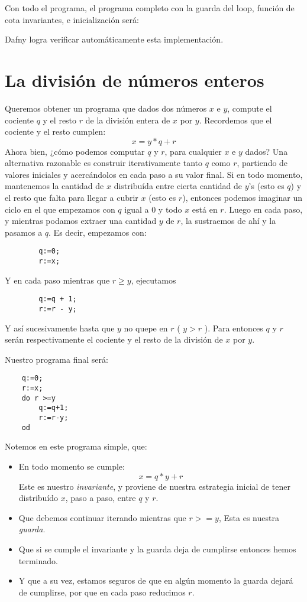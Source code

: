 \documentclass[12pt, a4paper, openany, fleqn]{book}
\begin{document}
    Con todo el programa, el programa completo con la guarda del loop, función de cota invariantes, e inicialización será:


    Dafny logra verificar automáticamente esta implementación.

    \section{La división de números enteros}
    Queremos obtener un programa que dados dos números $x$ e $y$, compute el cociente $q$ y el resto $r$ de la división entera de $x$ por $y$.
    Recordemos que el cociente y el resto cumplen:
    $$x = y * q + r$$
    Ahora bien, ¿cómo podemos computar $q$ y $r$, para cualquier $x$ e $y$ dados?
    Una alternativa razonable es construir iterativamente tanto $q$ como $r$, partiendo de valores iniciales y acercándolos en cada paso a su valor final.
    Si en todo momento, mantenemos la cantidad de $x$ distribuída entre cierta cantidad de $y$’s (esto es $q$) y el resto que falta para llegar a cubrir $x$ (esto es $r$), entonces podemos imaginar un ciclo en el que empezamos con $q$ igual a 0 y todo $x$ está en $r$.
    Luego en cada paso, y mientras podamos extraer una cantidad $y$ de $r$, la sustraemos de ahí y la pasamos a $q$.
    Es decir, empezamos con:
    \begin{verbatim}
        q:=0;
        r:=x;
    \end{verbatim}
    Y en cada paso mientras que $r \geq y$, ejecutamos
    \begin{verbatim}
        q:=q + 1;
        r:=r - y;
    \end{verbatim}

    Y así sucesivamente hasta que $y$ no quepe en $r$ ( $ y > r $ ). Para entonces $q$ y $r$ serán respectivamente el cociente y el resto de la división de $x$ por $y$.

    Nuestro programa final será:
    \begin{verbatim}
    q:=0;
    r:=x;
    do r >=y
        q:=q+1;
        r:=r-y;
    od
    \end{verbatim}
    Notemos en este programa simple, que:
    \begin{itemize}
        \item En todo momento se cumple:
        $$x = q * y + r$$
        Este es nuestro \textit{invariante}, y proviene de nuestra estrategia inicial de tener distribuído $x$, paso a paso, entre $q$ y $r$.
        \item Que debemos continuar iterando mientras que $r >= y$,
        Esta es nuestra \textit{guarda}.
        \item Que si se cumple el invariante y la guarda deja de cumplirse entonces hemos terminado.
        \item Y que a su vez, estamos seguros de que en algún momento la guarda dejará de cumplirse, por que en cada paso reducimos $r$.
    \end{itemize}
\end{document}
